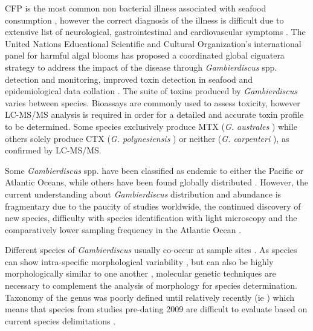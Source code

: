 \documentclass[12pt]{article}
\begin{document}
CFP is the most common non bacterial illness associated with seafood consumption \citep{friedman2008ciguatera}, however the correct diagnosis of the illness is difficult due to extensive list of neurological, gastrointestinal and cardiovascular symptoms \citep{sims1987theoretical}. The United Nations Educational Scientific and Cultural Organization's international panel for harmful algal blooms has proposed a coordinated global ciguatera strategy to address the impact of the disease through \emph{Gambierdiscus} spp. detection and monitoring, improved toxin detection in seafood and epidemiological data collation \citep{globalcig}.
The suite of toxins produced by \emph{Gambierdiscus} varies between species. Bioassays are commonly used to assess toxicity, however LC-MS/MS analysis is required in order for a detailed and accurate toxin profile to be determined\citep{diogened2014chemistry}. Some species exclusively produce MTX (\emph{G. australes} \citep{rhodes2014production}) while others solely produce CTX (\emph{G. polynesiensis} \citep{rhodes2014production}) or neither (\emph{G. carpenteri} \citep{kohli2014high}), as confirmed by LC-MS/MS. 

Some \emph{Gambierdiscus} spp. have been classified as endemic to either the Pacific or Atlantic Oceans, while others have been found globally distributed \citep{berdalet2012global,litaker2010global}. %
However, the current understanding about \emph{Gambierdiscus} distribution and abundance is fragmentary due to the paucity of studies worldwide, the continued discovery of new species, difficulty with species identification with light microscopy and the comparatively lower sampling frequency in the Atlantic Ocean \citep{berdalet2012global,nishimura2014morphology}. 

Different species of \emph{Gambierdiscus} usually co-occur at sample sites \citep{litaker2010global}. As species can show intra-specific morphological variability \citep{bravo2014cellular}, but can also be highly morphologically similar to one another \citep{kohli2014high}, molecular genetic techniques are necessary to complement the analysis of morphology for species determination. Taxonomy of the genus was poorly defined until relatively recently (ie \citep{litaker2009taxonomy,richlen2008phylogeography}) which means that species from studies pre-dating 2009 are difficult to evaluate based on current species delimitations \citep{berdalet2012global}. %
\end{document}
